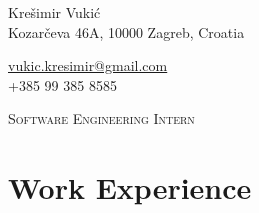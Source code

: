 \documentclass[a4paper,10pt]{article} %
\begin{document}
\pagestyle{empty} %



\begin{minipage}{.5\textwidth}
\LARGE{Krešimir Vukić}\\
\normalsize{Kozarčeva 46A, 10000 Zagreb, Croatia}
\end{minipage}%
\begin{minipage}{.5\textwidth}
\raggedleft
\href{mailto:vukic.kresimir@gmail.com}{vukic.kresimir@gmail.com} \\
+385 99 385 8585 \\
\end{minipage}

\vspace{5mm}


\begin{center}
\textsc{\large{Software Engineering Intern}}
\end{center}

\vspace{2mm}

\section{Work Experience}
\end{document}
